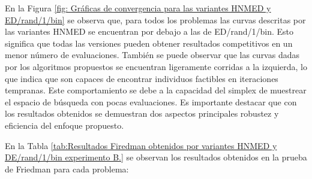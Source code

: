 En la Figura \ref{fig: Gráficas de convergencia para las variantes HNMED y ED/rand/1/bin} se observa que, para todos los problemas las curvas descritas por las variantes HNMED se encuentran por debajo a las de ED/rand/1/bin. Esto significa que todas las versiones pueden obtener resultados competitivos en un menor número de evaluaciones. También se puede observar que las curvas dadas por los algoritmos propuestos se encuentran ligeramente corridas a la izquierda, lo que indica que son capaces de encontrar individuos factibles en iteraciones tempranas. Este comportamiento se debe a la capacidad del simplex de muestrear el espacio de búsqueda con pocas evaluaciones. Es importante destacar que con los resultados obtenidos se demuestran dos aspectos principales robustez y eficiencia del enfoque propuesto. 

En la Tabla \ref{tab:Resultados Firedman obtenidos por variantes HNMED y DE/rand/1/bin  experimento B.} se observan los resultados obtenidos en la prueba de Friedman para cada problema:
